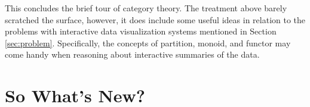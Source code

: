 \documentclass[12pt,a4paper]{article}
\begin{document}
% 
% 
% 
%   
%   
%     
%     
% 
% 

This concludes the brief tour of category theory. The treatment above barely scratched the surface, however, it does include some useful ideas in relation to the problems with interactive data visualization systems mentioned in Section \ref{sec:problem}. Specifically, the concepts of partition, monoid, and functor may come handy when reasoning about interactive summaries of the data.  

\section{So What's New?}
\label{sec:whatsnew}
\end{document}
